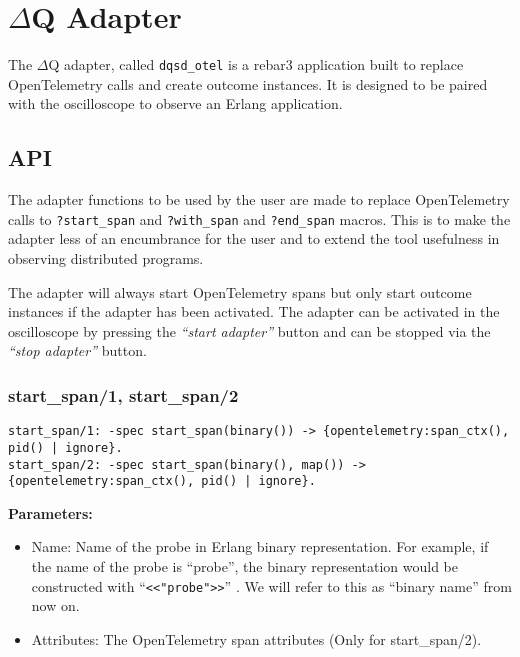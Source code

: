 \section{$\Delta$Q Adapter}
    The $\Delta$Q adapter, called \texttt{dqsd\_otel} is a rebar3 \cite{rebar3} application built to replace OpenTelemetry calls and create outcome instances. It is designed to be paired with the oscilloscope to observe an Erlang application.
    
    \subsection{API}
        The adapter functions to be used by the user are made to replace OpenTelemetry calls to \texttt{?start\_span} and \texttt{?with\_span} and \texttt{?end\_span} macros. This is to make the adapter less of an encumbrance for the user and to extend the tool usefulness in observing distributed programs. 

        The adapter will always start OpenTelemetry spans but only start outcome instances if the adapter has been activated. The adapter can be activated in the oscilloscope by pressing the \textit{``start adapter''} button and can be stopped via the \textit{``stop adapter''} button.
         
        \subsubsection{start\_span/1, start\_span/2}
        
        \begin{verbatim}        
start_span/1: -spec start_span(binary()) -> {opentelemetry:span_ctx(), pid() | ignore}.
start_span/2: -spec start_span(binary(), map()) -> {opentelemetry:span_ctx(), pid() | ignore}.  
        \end{verbatim}
        
        \textbf{Parameters:}
        \begin{itemize}
            \item Name: Name of the probe in Erlang binary representation. For example, if the name of the probe is ``probe'', the binary representation would be constructed with ``\texttt{<<"probe">>}'' \cite{bin-erl} \cite{bit-syntax}. We will refer to this as ``binary name'' from now on.
            \item Attributes: The OpenTelemetry span attributes (Only for start\_span/2).
        \end{itemize} 
        
